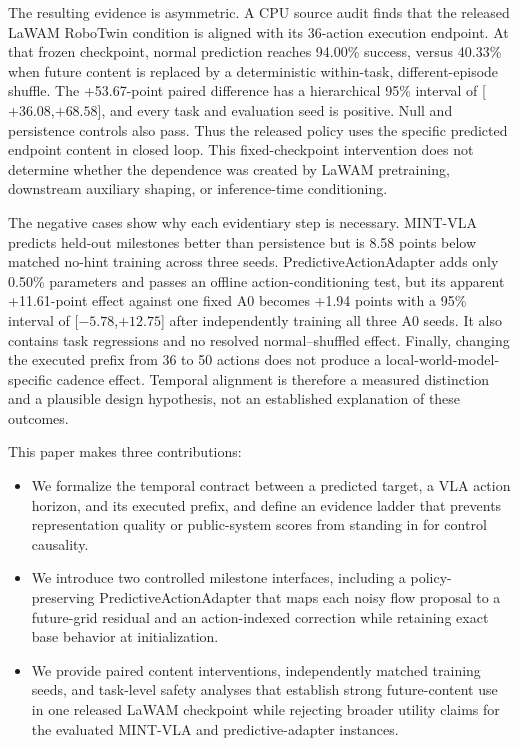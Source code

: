 The resulting evidence is asymmetric.  A CPU source audit finds that the
released LaWAM RoboTwin condition is aligned with its 36-action execution
endpoint.  At that frozen checkpoint, normal prediction reaches 94.00\%
success, versus 40.33\% when future content is replaced by a deterministic
within-task, different-episode shuffle.  The +53.67-point paired difference has
a hierarchical 95\% interval of [$+36.08$,$+68.58$], and every task and
evaluation seed is positive.  Null and persistence controls also pass.  Thus
the released policy uses the specific predicted endpoint content in closed
loop.  This fixed-checkpoint intervention does not determine whether the
dependence was created by LaWAM pretraining, downstream auxiliary shaping, or
inference-time conditioning.

The negative cases show why each evidentiary step is necessary.  MINT-VLA
predicts held-out milestones better than persistence but is 8.58 points below
matched no-hint training across three seeds.  PredictiveActionAdapter adds only
0.50\% parameters and passes an offline action-conditioning test, but its
apparent +11.61-point effect against one fixed A0 becomes +1.94 points with a
95\% interval of [$-5.78$,$+12.75$] after independently training all three A0
seeds.  It also contains task regressions and no resolved normal--shuffled
effect.  Finally, changing the executed prefix from 36 to 50 actions does not
produce a local-world-model-specific cadence effect.  Temporal alignment is
therefore a measured distinction and a plausible design hypothesis, not an
established explanation of these outcomes.

This paper makes three contributions:
\begin{itemize}
  \item We formalize the temporal contract between a predicted target, a VLA
  action horizon, and its executed prefix, and define an evidence ladder that
  prevents representation quality or public-system scores from standing in
  for control causality.
  \item We introduce two controlled milestone interfaces, including a
  policy-preserving PredictiveActionAdapter that maps each noisy flow proposal
  to a future-grid residual and an action-indexed correction while retaining
  exact base behavior at initialization.
  \item We provide paired content interventions, independently matched training
  seeds, and task-level safety analyses that establish strong future-content
  use in one released LaWAM checkpoint while rejecting broader utility claims
  for the evaluated MINT-VLA and predictive-adapter instances.
\end{itemize}
